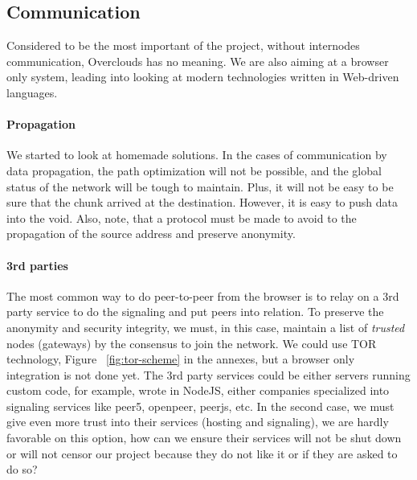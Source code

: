 
\subsection{Communication}
\label{sub:communication}
Considered to be the most important of the project, without internodes communication, Overclouds has no meaning. We are also aiming at a browser only system, leading into looking at modern technologies written in Web-driven languages.

\paragraph{Propagation} We started to look at homemade solutions. In the cases of communication by data propagation, the path optimization will not be possible, and the global status of the network will be tough to maintain. Plus, it will not be easy to be sure that the chunk arrived at the destination. However, it is easy to push data into the void. Also, note, that a protocol must be made to avoid to the propagation of the source address and preserve anonymity.

\paragraph{3rd parties} The most common way to do peer-to-peer from the browser is to relay on a 3rd party service to do the signaling and put peers into relation. To preserve the anonymity and security integrity, we must, in this case, maintain a list of \textit{trusted} nodes (gateways) by the consensus to join the network. We could use TOR technology, Figure ~\ref{fig:tor-scheme} in the annexes, but a browser only integration is not done yet. The 3rd party services could be either servers running custom code, for example, wrote in NodeJS, either companies specialized into signaling services like peer5\cite{Peer52015Peer5}, openpeer\cite{Hookflash2014OpenPeer}, peerjs\cite{SwitchPeerJS}, etc. In the second case, we must give even more trust into their services (hosting and signaling), we are hardly favorable on this option, how can we ensure their services will not be shut down or will not censor our project because they do not like it or if they are asked to do so?

